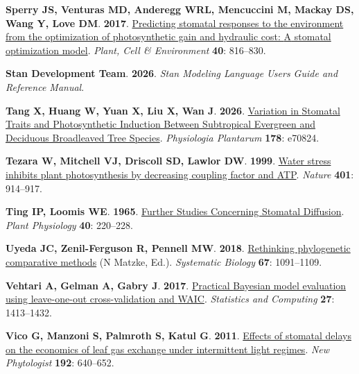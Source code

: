 \documentclass[
  letterpaper,
  DIV=11,
  numbers=noendperiod]{scrartcl}
\newlength{\cslhangindent}
\newenvironment{CSLReferences}[2] %
 {\begin{list}{}{%
  \setlength{\itemindent}{0pt}
  \setlength{\leftmargin}{0pt}
  \setlength{\parsep}{0pt}
  \ifodd #1
   \setlength{\leftmargin}{\cslhangindent}
   \setlength{\itemindent}{-1\cslhangindent}
  \fi
  \setlength{\itemsep}{#2\baselineskip}}}
 {\end{list}}
\begin{document}
\begin{CSLReferences}{0}{1}
\textbf{\textbf{Sperry JS}, \textbf{Venturas MD}, \textbf{Anderegg WRL},
\textbf{Mencuccini M}, \textbf{Mackay DS}, \textbf{Wang Y}, \textbf{Love
DM}}. \textbf{2017}. \href{https://doi.org/10.1111/pce.12852}{Predicting
stomatal responses to the environment from the optimization of
photosynthetic gain and hydraulic cost: {A} stomatal optimization
model}. \emph{Plant, Cell \& Environment} \textbf{40}: 816--830.

\textbf{\textbf{Stan Development Team}}. \textbf{2026}. \emph{Stan
{Modeling Language Users Guide} and {Reference Manual}}.

\textbf{\textbf{Tang X}, \textbf{Huang W}, \textbf{Yuan X}, \textbf{Liu
X}, \textbf{Wan J}}. \textbf{2026}.
\href{https://doi.org/10.1111/ppl.70824}{Variation in {Stomatal Traits}
and {Photosynthetic Induction Between Subtropical Evergreen} and
{Deciduous Broadleaved Tree Species}}. \emph{Physiologia Plantarum}
\textbf{178}: e70824.

\textbf{\textbf{Tezara W}, \textbf{Mitchell VJ}, \textbf{Driscoll SD},
\textbf{Lawlor DW}}. \textbf{1999}.
\href{https://doi.org/10.1038/44842}{Water stress inhibits plant
photosynthesis by decreasing coupling factor and {ATP}}. \emph{Nature}
\textbf{401}: 914--917.

\textbf{\textbf{Ting IP}, \textbf{Loomis WE}}. \textbf{1965}.
\href{https://doi.org/10.1104/pp.40.2.220}{Further {Studies Concerning
Stomatal Diffusion}}. \emph{Plant Physiology} \textbf{40}: 220--228.

\textbf{\textbf{Uyeda JC}, \textbf{Zenil-Ferguson R}, \textbf{Pennell
MW}}. \textbf{2018}.
\href{https://doi.org/10.1093/sysbio/syy031}{Rethinking phylogenetic
comparative methods} (N Matzke, Ed.). \emph{Systematic Biology}
\textbf{67}: 1091--1109.

\textbf{\textbf{Vehtari A}, \textbf{Gelman A}, \textbf{Gabry J}}.
\textbf{2017}.
\href{https://doi.org/10.1007/s11222-016-9696-4}{Practical {Bayesian}
model evaluation using leave-one-out cross-validation and {WAIC}}.
\emph{Statistics and Computing} \textbf{27}: 1413--1432.

\textbf{\textbf{Vico G}, \textbf{Manzoni S}, \textbf{Palmroth S},
\textbf{Katul G}}. \textbf{2011}.
\href{https://doi.org/10.1111/j.1469-8137.2011.03847.x}{Effects of
stomatal delays on the economics of leaf gas exchange under intermittent
light regimes}. \emph{New Phytologist} \textbf{192}: 640--652.


\end{CSLReferences}
\end{document}
